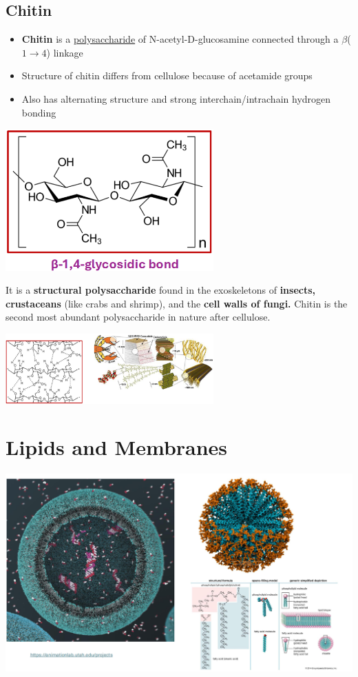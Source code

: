 \documentclass[10pt]{article}
\begin{document}
\subsection*{Chitin}
\begin{itemize}
    \item \textbf{Chitin} is a \underline{polysaccharide} of N-acetyl-D-glucosamine connected through a $\beta$($1 \rightarrow 4$) linkage
    \item Structure of chitin differs from cellulose because of acetamide groups
    \item Also has alternating structure and strong interchain/intrachain hydrogen bonding
\end{itemize}
\begin{center}
    \includegraphics*[width=0.6\textwidth]{L1_26.png}
\end{center}
It is a \textbf{structural polysaccharide} found in the exoskeletons of \textbf{insects, crustaceans} (like crabs and shrimp), and the \textbf{cell walls of fungi.}  Chitin is the second most abundant polysaccharide in nature after cellulose.
\begin{center}
    \includegraphics*[width=0.6\textwidth]{L1_27.png}
\end{center}

\section*{Lipids and Membranes}
\begin{center}
    \includegraphics*[width=\textwidth]{L2_1.png}
\end{center}
\end{document}
